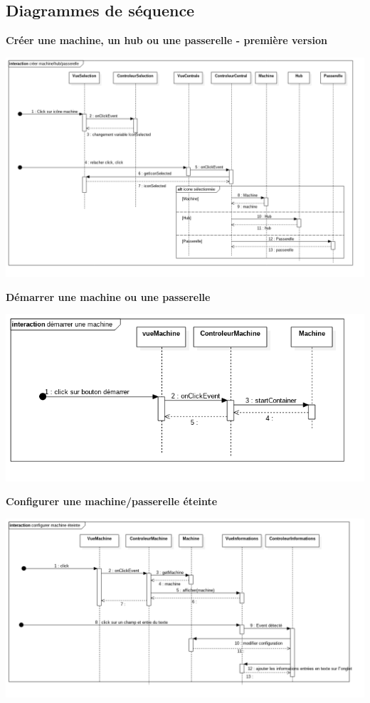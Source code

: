 \newpage
\subsection{Diagrammes de séquence}
\textbf{Créer une machine, un hub ou une passerelle - première version}
\begin{center}
\includegraphics[scale=0.4]{createmachine.png}
\end{center}

\textbf{Démarrer une machine ou une passerelle} 
\begin{center}
\includegraphics[scale=0.55]{startmachine.png}
\end{center}

\vspace{17\baselineskip}
\textbf{Configurer une machine/passerelle éteinte} 
\begin{center}
\includegraphics[scale=0.4]{configuredownmachine.png}
\end{center}

